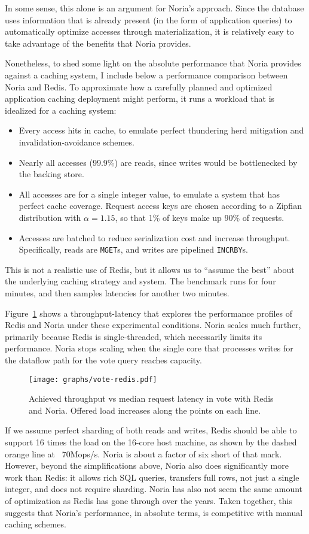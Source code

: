 In some sense, this alone is an argument for Noria's approach. Since the
database uses information that is already present (in the form of application
queries) to automatically optimize accesses through materialization, it is
relatively easy to take advantage of the benefits that Noria provides.

Nonetheless, to shed some light on the absolute performance that Noria provides
against a caching system, I include below a performance comparison between Noria
and Redis. To approximate how a carefully planned and optimized application
caching deployment might perform, it runs a workload that is idealized for a
caching system:

\begin{itemize}
 \item Every access hits in cache, to emulate perfect thundering herd mitigation
   and invalidation-avoidance schemes.
 \item Nearly all accesses (99.9\%) are reads, since writes would be
   bottlenecked by the backing store.
 \item All accesses are for a single integer value, to emulate a system that has
   perfect cache coverage. Request access keys are chosen according to a Zipfian
    distribution with $\alpha = 1.15$, so that 1\% of keys make up 90\% of
    requests.
 \item Accesses are batched to reduce serialization cost and increase
   throughput. Specifically, reads are \texttt{MGET}s, and writes are pipelined
    \texttt{INCRBY}s.
\end{itemize}

This is not a realistic use of Redis, but it allows us to ``assume the best''
about the underlying caching strategy and system. The benchmark runs for four
minutes, and then samples latencies for another two minutes.

Figure~\ref{f:vote-redis} shows a throughput-latency that explores the
performance profiles of Redis and Noria under these experimental conditions.
Noria scales much further, primarily because Redis is single-threaded, which
necessarily limits its performance. Noria stops scaling when the single core
that processes writes for the dataflow path for the vote query reaches capacity.

\begin{figure}[ht]
  \centering
  \texttt{[image: graphs/vote-redis.pdf]}
  \caption{Achieved throughput vs median request latency in vote with Redis and
  Noria. Offered load increases along the points on each line.}
  \label{f:vote-redis}
\end{figure}

If we assume perfect sharding of both reads and writes, Redis should be able to
support 16 times the load on the 16-core host machine, as shown by the dashed
orange line at ~70Mops/s. Noria is about a factor of six short of that mark.
However, beyond the simplifications above, Noria also does significantly more
work than Redis: it allows rich SQL queries, transfers full rows, not just a
single integer, and does not require sharding. Noria has also not seem the same
amount of optimization as Redis has gone through over the years. Taken together,
this suggests that Noria's performance, in absolute terms, is competitive with
manual caching schemes.
